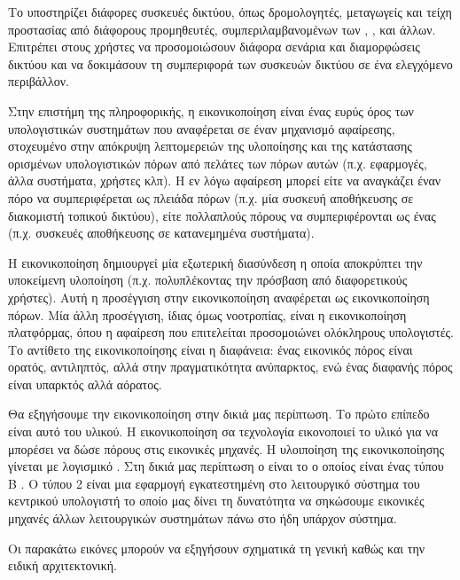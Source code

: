 Το  υποστηρίζει διάφορες συσκευές δικτύου, όπως δρομολογητές, μεταγωγείς και τείχη προστασίας 
από διάφορους προμηθευτές, συμπεριλαμβανομένων των , ,  και άλλων. Επιτρέπει στους χρήστες να 
προσομοιώσουν διάφορα σενάρια και διαμορφώσεις δικτύου και να δοκιμάσουν τη συμπεριφορά των 
συσκευών δικτύου σε ένα ελεγχόμενο περιβάλλον. 

Στην επιστήμη της πληροφορικής, η εικονικοποίηση  είναι ένας ευρύς όρος 
των υπολογιστικών συστημάτων που αναφέρεται σε έναν μηχανισμό αφαίρεσης, 
στοχευμένο στην απόκρυψη λεπτομερειών της υλοποίησης και της κατάστασης
ορισμένων υπολογιστικών πόρων από πελάτες των πόρων αυτών 
(π.χ. εφαρμογές, άλλα συστήματα, χρήστες κλπ). 
Η εν λόγω αφαίρεση μπορεί είτε να αναγκάζει έναν πόρο να 
συμπεριφέρεται ως πλειάδα πόρων (π.χ. μία συσκευή αποθήκευσης σε διακομιστή τοπικού δικτύου),
είτε πολλαπλούς πόρους να συμπεριφέρονται ως ένας (π.χ. συσκευές αποθήκευσης σε κατανεμημένα συστήματα). 

Η εικονικοποίηση δημιουργεί μία εξωτερική διασύνδεση η οποία αποκρύπτει την 
υποκείμενη υλοποίηση (π.χ. πολυπλέκοντας την πρόσβαση από διαφορετικούς χρήστες).
Αυτή η προσέγγιση στην εικονικοποίηση αναφέρεται ως εικονικοποίηση πόρων. 
Μία άλλη προσέγγιση, ίδιας όμως νοοτροπίας, είναι η εικονικοποίηση πλατφόρμας,
όπου η αφαίρεση που επιτελείται προσομοιώνει ολόκληρους υπολογιστές. Το αντίθετο της εικονικοποίησης είναι η διαφάνεια: 
ένας εικονικός πόρος είναι ορατός, αντιληπτός, αλλά στην πραγματικότητα ανύπαρκτος, 
ενώ ένας διαφανής πόρος είναι υπαρκτός αλλά αόρατος. 
 
Θα εξηγήσουμε την εικονικοποίηση στην δικιά μας περίπτωση. Το πρώτο επίπεδο είναι αυτό του υλικού. Η εικονικοποίηση
σα τεχνολογία εικονοποιεί το υλικό για να μπορέσει να δώσε πόρους στις εικονικές μηχανές. Η υλοιποίηση
της εικονικοποίησης γίνεται με λογισμικό . Στη δικιά μας περίπτωση ο  είναι 
το  ο οποίος είναι ένας τύπου Β . Ο  τύπου 2 είναι μια εφαρμογή εγκατεστημένη 
στο λειτουργικό σύστημα του κεντρικού υπολογιστή το οποίο μας δίνει τη δυνατότητα να σηκώσουμε 
εικονικές μηχανές άλλων λειτουργικών συστημάτων πάνω στο ήδη υπάρχον σύστημα.

Οι παρακάτω εικόνες μπορούν να εξηγήσουν σχηματικά τη γενική καθώς και την ειδική αρχιτεκτονική.

